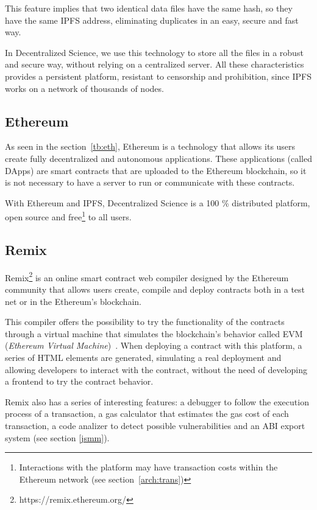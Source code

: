 This feature implies that two identical data files have the same hash, so they
have the same IPFS address, eliminating duplicates in an easy, secure and fast
way.

In Decentralized Science, we use this technology to store all the files in a
robust and secure way, without relying on a centralized server. All these
characteristics provides a persistent platform, resistant to censorship and
prohibition, since IPFS works on a network of thousands of nodes.

\subsection{Ethereum}
\label{tech:sec:ethereum}
As seen in the section~\ref{tb:eth}, Ethereum is a technology that allows its
users create fully decentralized and autonomous applications. These applications
(called DApps) are smart contracts that are uploaded to the Ethereum blockchain,
so it is not necessary to have a server to run or communicate with these
contracts.

With Ethereum and IPFS, Decentralized Science is a 100 \% distributed platform,
open source and free\footnote{Interactions with the platform may have
  transaction costs within the Ethereum network (see section~\ref{arch:trans})
  \nopagebreak} to all users.


\subsection{Remix}
Remix\footnote{https://remix.ethereum.org/} is an online smart
contract web compiler designed by the Ethereum community that allows users
create, compile and deploy contracts both in a test net or in the Ethereum's
blockchain.

This compiler offers the possibility to try the functionality of the contracts
through a virtual machine that simulates the blockchain's behavior called EVM
(\emph{Ethereum Virtual Machine})~\cite{hildenbrandt2017kevm}. When deploying a
contract with this platform, a series of HTML elements are generated, simulating
a real deployment and allowing developers to interact with the contract, without
the need of developing a frontend to try the contract behavior.

Remix also has a series of interesting features: a debugger to follow the
execution process of a transaction, a gas calculator that estimates the gas cost
of each transaction, a code analizer to detect possible vulnerabilities and an
ABI export system (see section \ref{jsmm}).

